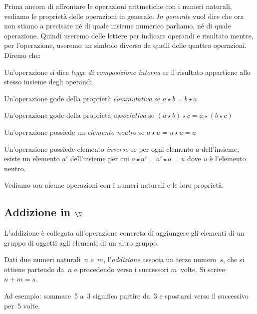 Prima ancora di affrontare le operazioni aritmetiche con i numeri naturali, 
vediamo le proprietà delle operazioni in generale. \emph{In generale} vuol 
dire che ora non stiamo a precisare né di quale insieme numerico parliamo, 
né di quale operazione. Quindi useremo delle lettere per indicare  
operandi e  risultato mentre, per l'operazione, useremo un simbolo diverso 
da quelli delle quattro operazioni. Diremo che:

\begin{itemize*}
 \item Un'operazione si dice \emph{legge di composizione interna} se
  il risultato appartiene allo stesso insieme degli operandi.
 \item Un'operazione gode della proprietà \emph{commutativa} se 
  \(a \star b = b \star a\)
 \item Un'operazione gode della proprietà \emph{associativa} se 
  \((a \star b) \star c = a \star (b \star c)\)
 \item Un'operazione possiede un \emph{elemento neutro} se 
  \(a \star u = u \star a = a\)
 \item Un'operazione possiede elemento \emph{inverso} se per ogni
  elemento \(a\) dell'insieme, esiste un elemento \(a'\) 
  dell'insieme per cui \(a \star a' = a' \star a = u\) dove \(u\) è l'elemento
  neutro.
\end{itemize*}

Vediamo ora alcune operazioni con i numeri naturali e le loro proprietà.

\subsection{Addizione in \(\N\)}

L'addizione è collegata all'operazione concreta di aggiungere gli elementi di 
un gruppo di oggetti agli elementi di un altro gruppo.

\begin{definizione}
  Dati due numeri naturali~\(n\) e~\(m\), l'\emph{addizione} associa un terzo 
  numero~\(s\), che si ottiene partendo da~\(n\) e procedendo verso i 
  successori \(m\)~volte. Si scrive~\(n+m=s\).
\end{definizione}

Ad esempio: sommare~5 a~3 significa partire da~3 e spostarsi verso il 
successivo per~5 volte.

